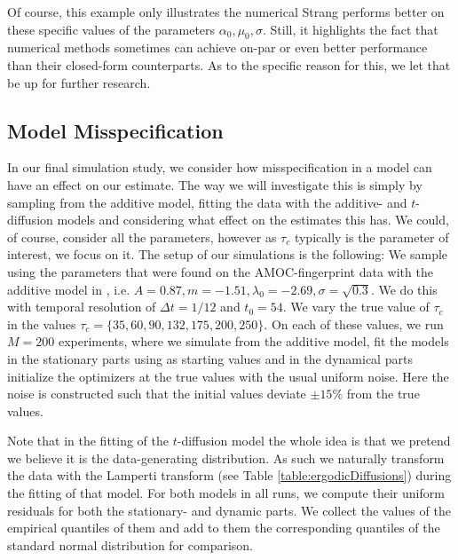 Of course, this example only illustrates the numerical Strang performs better on these specific values of the parameters $\alpha_0, \mu_0, \sigma$. Still, it highlights the fact that numerical methods sometimes can achieve on-par or even better performance than their closed-form counterparts. As to the specific reason for this, we let that be up for further research.
\subsection{Model Misspecification}
In our final simulation study, we consider how misspecification in a model can have an effect on our estimate. The way we will investigate this is simply by sampling from the additive model, fitting the data with the additive- and $t$-diffusion models and considering what effect on the estimates this has. We could, of course, consider all the parameters, however as $\tau_c$ typically is the parameter of interest, we focus on it. The setup of our simulations is the following: We sample using the parameters that were found on the AMOC-fingerprint data with the additive model in \cite[Figure 6]{Ditlevsen2023}, i.e. $A = 0.87, m = -1.51, \lambda_0 = -2.69, \sigma = \sqrt{0.3}$. We do this with temporal resolution of $\Delta t = 1/12$ and $t_0 =54$. We vary the true value of $\tau_c$ in the values $\tau_c = \{35, 60, 90, 132, 175, 200, 250\}$. On each of these values, we run $M = 200$ experiments, where we simulate from the additive model, fit the models in the stationary parts using \cite[equation (S4-S6)]{DitlevsenSupplementary} as starting values and in the dynamical parts initialize the optimizers at the true values with the usual uniform noise. Here the noise is constructed such that the initial values deviate $\pm 15\%$ from the true values.

Note that in the fitting of the $t$-diffusion model the whole idea is that we pretend we believe it is the data-generating distribution. As such we naturally transform the data with the Lamperti transform (see Table \ref{table:ergodicDiffusions}) during the fitting of that model. For both models in all runs, we compute their uniform residuals for both the stationary- and dynamic parts. We collect the values of the empirical quantiles of them and add to them the corresponding quantiles of the standard normal distribution for comparison.

